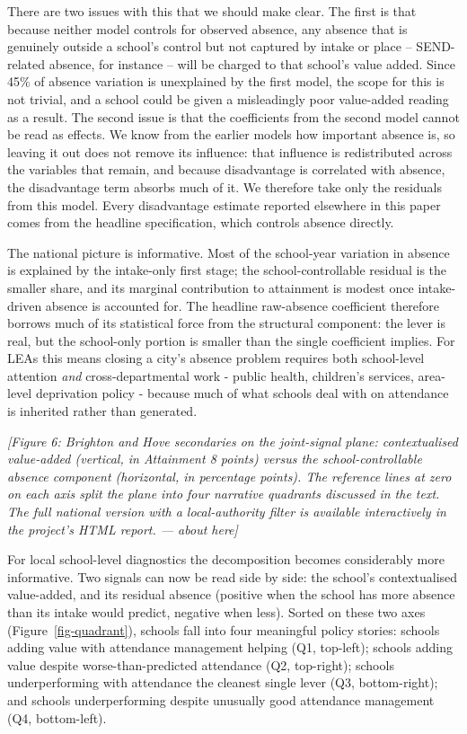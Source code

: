 \documentclass[
  12pt,
  titlepage]{article}
\begin{document}
There are two issues with this that we should make clear. The first is
that because neither model controls for observed absence, any absence
that is genuinely outside a school's control but not captured by intake
or place -- SEND-related absence, for instance -- will be charged to
that school's value added. Since 45\% of absence variation is
unexplained by the first model, the scope for this is not trivial, and a
school could be given a misleadingly poor value-added reading as a
result. The second issue is that the coefficients from the second model
cannot be read as effects. We know from the earlier models how important
absence is, so leaving it out does not remove its influence: that
influence is redistributed across the variables that remain, and because
disadvantage is correlated with absence, the disadvantage term absorbs
much of it. We therefore take only the residuals from this model. Every
disadvantage estimate reported elsewhere in this paper comes from the
headline specification, which controls absence directly.

The national picture is informative. Most of the school-year variation
in absence is explained by the intake-only first stage; the
school-controllable residual is the smaller share, and its marginal
contribution to attainment is modest once intake-driven absence is
accounted for. The headline raw-absence coefficient therefore borrows
much of its statistical force from the structural component: the lever
is real, but the school-only portion is smaller than the single
coefficient implies. For LEAs this means closing a city's absence
problem requires both school-level attention \emph{and}
cross-departmental work - public health, children's services, area-level
deprivation policy - because much of what schools deal with on
attendance is inherited rather than generated.

\emph{{[}Figure 6: Brighton and Hove secondaries on the joint-signal
plane: contextualised value-added (vertical, in Attainment 8 points)
versus the school-controllable absence component (horizontal, in
percentage points). The reference lines at zero on each axis split the
plane into four narrative quadrants discussed in the text. The full
national version with a local-authority filter is available
interactively in the project's HTML report. --- about here{]}}

For local school-level diagnostics the decomposition becomes
considerably more informative. Two signals can now be read side by side:
the school's contextualised value-added, and its residual absence
(positive when the school has more absence than its intake would
predict, negative when less). Sorted on these two axes
(Figure~\ref{fig-quadrant}), schools fall into four meaningful policy
stories: schools adding value with attendance management helping (Q1,
top-left); schools adding value despite worse-than-predicted attendance
(Q2, top-right); schools underperforming with attendance the cleanest
single lever (Q3, bottom-right); and schools underperforming despite
unusually good attendance management (Q4, bottom-left).
\end{document}
